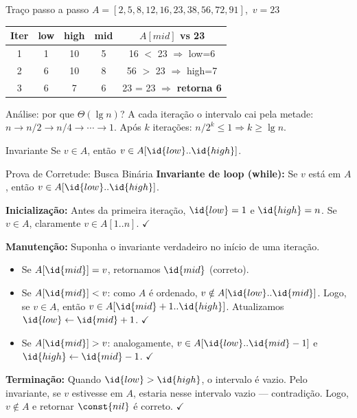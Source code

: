 \documentclass[aspectratio=169]{beamer}
\begin{document}
\begin{frame}{Traço passo a passo}
$A=[2,5,8,12,16,23,38,56,72,91]$,\ $v=23$
\vspace{0.3cm}

\begin{tabular}{ccccc}
\toprule
Iter & low & high & mid & $A[mid]$ vs 23 \\
\midrule
1 & 1 & 10 & 5 & 16 $<$ 23 $\Rightarrow$ low=6 \\
2 & 6 & 10 & 8 & 56 $>$ 23 $\Rightarrow$ high=7 \\
3 & 6 & 7 & 6 & 23 = 23 $\Rightarrow$ \textbf{retorna 6} \\
\bottomrule
\end{tabular}
\end{frame}

\begin{frame}{Análise: por que $\Theta(\lg n)$?}
A cada iteração o intervalo cai pela metade: $n \to n/2 \to n/4 \to \cdots \to 1$.
Após $k$ iterações: $n/2^k \leq 1 \Rightarrow k \geq \lg n$.

\begin{block}{Invariante}
Se $v \in A$, então $v \in A[\id{low}..\id{high}]$.
\end{block}
\end{frame}

\begin{frame}{Prova de Corretude: Busca Binária}
\textbf{Invariante de loop (while):} Se $v$ está em $A$, então $v \in A[\id{low}..\id{high}]$.

\vspace{0.3cm}
\textbf{Inicialização:} Antes da primeira iteração, $\id{low}=1$ e $\id{high}=n$. Se $v \in A$, claramente $v \in A[1..n]$. $\checkmark$

\vspace{0.3cm}
\textbf{Manutenção:} Suponha o invariante verdadeiro no início de uma iteração.
\begin{itemize}
\item Se $A[\id{mid}]=v$, retornamos $\id{mid}$ (correto).
\item Se $A[\id{mid}]<v$: como $A$ é ordenado, $v \notin A[\id{low}..\id{mid}]$. Logo, se $v \in A$, então $v \in A[\id{mid}+1..\id{high}]$. Atualizamos $\id{low} \gets \id{mid}+1$. $\checkmark$
\item Se $A[\id{mid}]>v$: analogamente, $v \in A[\id{low}..\id{mid}-1]$ e $\id{high} \gets \id{mid}-1$. $\checkmark$
\end{itemize}

\vspace{0.3cm}
\textbf{Terminação:} Quando $\id{low}>\id{high}$, o intervalo é vazio. Pelo invariante, se $v$ estivesse em $A$, estaria nesse intervalo vazio --- contradição. Logo, $v \notin A$ e retornar $\const{nil}$ é correto. $\checkmark$
\end{frame}
\end{document}
